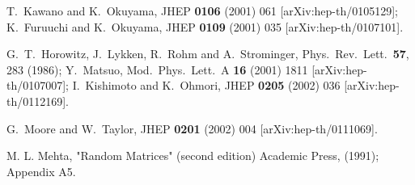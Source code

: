 \documentclass[a4paper,aps,preprint,nofootinbib,eqsecnum]{revtex4}
\begin{document}
\begin{thebibliography}{99}
 {\small T.~Kawano and K.~Okuyama,%
JHEP \textbf{0106} (2001) 061 [arXiv:hep-th/0105129];\newline
K.~Furuuchi and K.~Okuyama, %
JHEP \textbf{0109} (2001) 035 [arXiv:hep-th/0107101].
}

 {\small G.~T.~Horowitz, J.~Lykken, R.~Rohm and A.~Strominger,
Phys.\ Rev.\ Lett.\ \textbf{57}, 283 (1986);\newline
Y.~Matsuo,
Mod.\ Phys.\ Lett.\ A \textbf{16} (2001) 1811 [arXiv:hep-th/0107007];\newline
I.~Kishimoto and K.~Ohmori,
JHEP \textbf{0205} (2002) 036 [arXiv:hep-th/0112169]. }

 {\small G.~Moore and W.~Taylor,
JHEP \textbf{0201} (2002) 004 [arXiv:hep-th/0111069].
}

 {\small M. L. Mehta, "Random Matrices" (second edition)
Academic Press, (1991); Appendix A5. }
\end{thebibliography}
\end{document}
